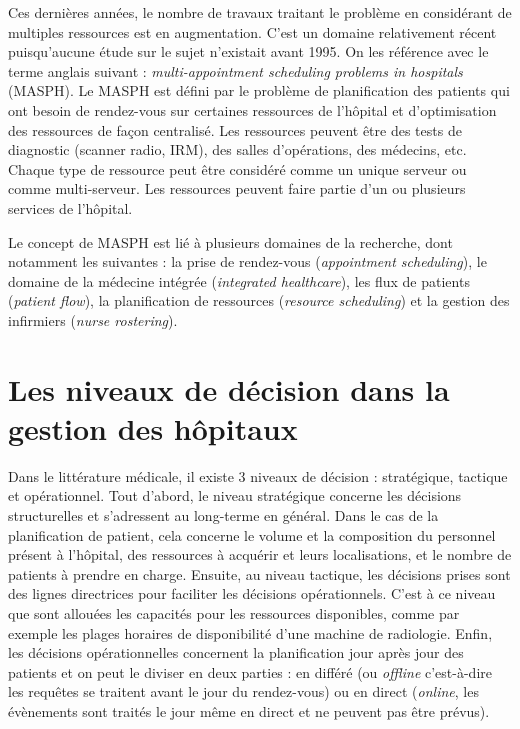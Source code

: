 \documentclass[noposter]{polytech/polytech}
\begin{document}
Ces dernières années, le nombre de travaux traitant le problème en considérant de multiples ressources est en augmentation. C'est un domaine relativement récent puisqu'aucune étude sur le sujet n'existait avant 1995. On les référence avec le terme anglais suivant : \textit{multi-appointment scheduling problems in hospitals} (MASPH). Le MASPH est défini par le problème de planification des patients qui ont besoin de rendez-vous sur certaines ressources de l'hôpital et d'optimisation des ressources de façon centralisé. Les ressources peuvent être des tests de diagnostic (scanner radio, IRM), des salles d'opérations, des médecins, etc. Chaque type de ressource peut être considéré comme un unique serveur ou comme multi-serveur. Les ressources peuvent faire partie d'un ou plusieurs services de l'hôpital. 

Le concept de MASPH est lié à plusieurs domaines de la recherche, dont notamment les suivantes : la prise de rendez-vous (\textit{appointment scheduling}), le domaine de la médecine intégrée (\textit{integrated healthcare}), les flux de patients (\textit{patient flow}), la planification de ressources (\textit{resource scheduling}) et la gestion des infirmiers (\textit{nurse rostering}). 


\section{Les niveaux de décision dans la gestion des hôpitaux}

Dans le littérature médicale, il existe 3 niveaux de décision : stratégique, tactique et opérationnel. Tout d'abord, le niveau stratégique concerne les décisions structurelles et s'adressent au long-terme en général. Dans le cas de la planification de patient, cela concerne le volume et la composition du personnel présent à l'hôpital, des ressources à acquérir et leurs localisations, et le nombre de patients à prendre en charge. Ensuite, au niveau tactique, les décisions prises sont des lignes directrices pour faciliter les décisions opérationnels. C'est à ce niveau que sont allouées les capacités pour les ressources disponibles, comme par exemple les plages horaires de disponibilité d'une machine de radiologie. Enfin, les décisions opérationnelles concernent la planification jour après jour des patients et on peut le diviser en deux parties : en différé (ou \textit{offline} c'est-à-dire les requêtes se traitent avant le jour du rendez-vous) ou en direct (\textit{online}, les évènements sont traités le jour même en direct et ne peuvent pas être prévus). 
\end{document}
